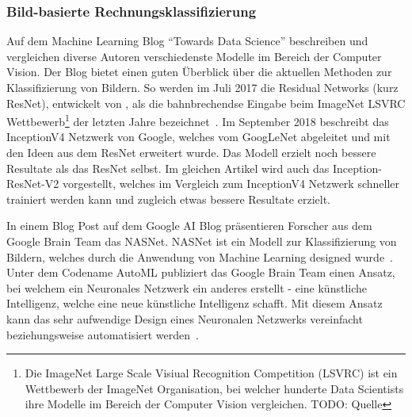 \subsubsection{Bild-basierte Rechnungsklassifizierung}



Auf dem Machine Learning Blog \enquote{Towards Data Science} beschreiben und vergleichen diverse Autoren verschiedenste Modelle im Bereich der Computer Vision. Der Blog bietet einen guten Überblick über die aktuellen Methoden zur Klassifizierung von Bildern. So werden im Juli 2017 die Residual Networks (kurz ResNet), entwickelt von \textcite{He2015}, als die bahnbrechendse Eingabe beim ImageNet LSVRC Wettbewerb\footnote{Die ImageNet Large Scale Visiual Recognition Competition (LSVRC) ist ein Wettbewerb der ImageNet Organisation, bei welcher hunderte Data Scientists ihre Modelle im Bereich der Computer Vision vergleichen. TODO: Quelle} der letzten Jahre bezeichnet~\autocite{Fungg2017ResNet}. Im September 2018 beschreibt \textcite{SHTsuang2018Inception} das InceptionV4 Netzwerk von Google, welches vom GoogLeNet abgeleitet und mit den Ideen aus dem ResNet erweitert wurde. Das Modell erzielt noch bessere Resultate als das ResNet selbst. Im gleichen Artikel wird auch das Inception-ResNet-V2 vorgestellt, welches im Vergleich zum InceptionV4 Netzwerk schneller trainiert werden kann und zugleich etwas bessere Resultate erzielt. 

In einem Blog Post auf dem Google AI Blog präsentieren Forscher aus dem Google Brain Team das NASNet. NASNet ist ein Modell zur Klassifizierung von Bildern, welches durch die Anwendung von Machine Learning designed wurde~\autocite{GoogleNasNet}. Unter dem Codename AutoML publiziert das Google Brain Team einen Ansatz, bei welchem ein Neuronales Netzwerk ein anderes erstellt - eine künstliche Intelligenz, welche eine neue künstliche Intelligenz schafft. Mit diesem Ansatz kann das sehr aufwendige Design eines Neuronalen Netzwerks vereinfacht beziehungsweise automatisiert werden~\autocite{GoogleAutoML}.

